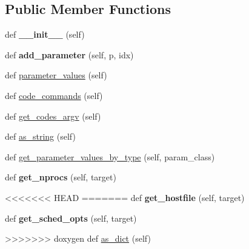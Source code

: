 \subsection*{Public Member Functions}
\begin{DoxyCompactItemize}
\item 
\mbox{\label{classcodar_1_1cheetah_1_1parameters_1_1_instance_abc52192d373d1741efd7566d320d68c1}} 
def {\bfseries \+\_\+\+\_\+init\+\_\+\+\_\+} (self)
\item 
\mbox{\label{classcodar_1_1cheetah_1_1parameters_1_1_instance_a600511535b03f1796f9a0d84b654e113}} 
def {\bfseries add\+\_\+parameter} (self, p, idx)
\item 
def \hyperlink{classcodar_1_1cheetah_1_1parameters_1_1_instance_a4a943c0f5f3afe8b9a4ff9b238aab766}{parameter\+\_\+values} (self)
\item 
def \hyperlink{classcodar_1_1cheetah_1_1parameters_1_1_instance_a417d9d44a5eb0e0b8812fc427ddc4435}{code\+\_\+commands} (self)
\item 
def \hyperlink{classcodar_1_1cheetah_1_1parameters_1_1_instance_a4ee126bbceeb792914185ca9fbe59101}{get\+\_\+codes\+\_\+argv} (self)
\item 
def \hyperlink{classcodar_1_1cheetah_1_1parameters_1_1_instance_a053717fc3ee7840a7c32173f15e99ae3}{as\+\_\+string} (self)
\item 
def \hyperlink{classcodar_1_1cheetah_1_1parameters_1_1_instance_ab1187231851e554aa1e95f7e7eee7b77}{get\+\_\+parameter\+\_\+values\+\_\+by\+\_\+type} (self, param\+\_\+class)
\item 
\mbox{\label{classcodar_1_1cheetah_1_1parameters_1_1_instance_add69b3c4bcc37530ba16bd77cd843872}} 
def {\bfseries get\+\_\+nprocs} (self, target)
\item 
<<<<<<< HEAD
=======
\mbox{\label{classcodar_1_1cheetah_1_1parameters_1_1_instance_a54136234ef868666b93d88f6be0117ff}} 
def {\bfseries get\+\_\+hostfile} (self, target)
\item 
\mbox{\label{classcodar_1_1cheetah_1_1parameters_1_1_instance_a584b71500e5f5ef6bec6d6f2f6bb95ae}} 
def {\bfseries get\+\_\+sched\+\_\+opts} (self, target)
\item 
>>>>>>> doxygen
def \hyperlink{classcodar_1_1cheetah_1_1parameters_1_1_instance_ae978374d4b5e01c2764b9513ae38a961}{as\+\_\+dict} (self)
\end{DoxyCompactItemize}


